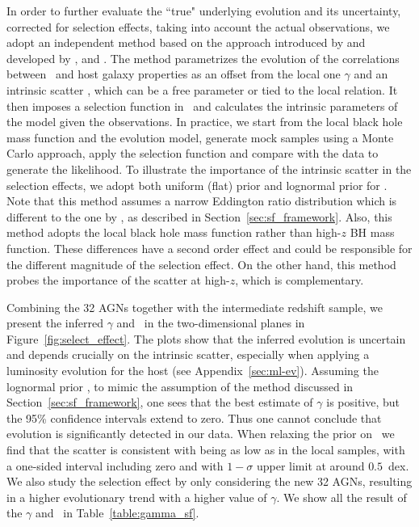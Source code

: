 \documentclass[apj]{emulateapj}
\begin{document}

In order to further evaluate the ``true" underlying evolution and its uncertainty, corrected for selection effects, taking into account the actual observations, we adopt an independent method based on the approach introduced by \citet{Tre++07} and developed by \citet{Ben++10}, \citet{Park15} and \citet{Ding2017b}. The method parametrizes the evolution of the correlations between \mbh\ and host galaxy properties as an offset from the local one $\gamma$ and an intrinsic scatter \sint, which can be a free parameter or tied to the local relation. It then imposes a selection function in \mbh\ and calculates the intrinsic parameters of the model given the observations. In practice, we start from the local black hole mass function and the evolution model, generate mock samples using a Monte Carlo approach, apply the selection function and compare with the data to generate the likelihood. To illustrate the importance of the intrinsic scatter in the selection effects, we adopt both uniform (flat) prior and lognormal prior for \sint. 
Note that this method assumes a narrow Eddington ratio distribution which is different to the one by \citet{Schulze2011}, as described in Section~\ref{sec:sf_framework}. Also, this method adopts the local black hole mass function rather than high-$z$ BH mass function. These differences have a second order effect and could be responsible for the different magnitude of the selection effect. On the other hand, this method probes the importance of the scatter at high-$z$, which is complementary. %

Combining the 32 AGNs together with the intermediate redshift sample, we present the inferred  $\gamma$ and \sint\ in the two-dimensional planes in Figure~\ref{fig:select_effect}. The plots show that the inferred evolution is uncertain and depends crucially on the intrinsic scatter, especially when applying a luminosity evolution for the host (see Appendix~\ref{sec:ml-ev}). Assuming the lognormal prior \sint, to mimic the assumption of the method discussed in Section~\ref{sec:sf_framework}, one sees that the best estimate of $\gamma$ is positive, but the 95\% confidence intervals extend to zero. Thus one cannot conclude that evolution is significantly detected in our data. 
When relaxing the prior on \sint\ we find that the scatter is consistent with being as low as in the local samples, with a one-sided interval including zero and with $1-\sigma$ upper limit at around $0.5$~dex. 
We also study the selection effect by only considering the new 32 AGNs, resulting in a higher evolutionary trend with a higher value of $\gamma$. We show all the result of the $\gamma$ and \sint\ in Table~\ref{table:gamma_sf}.
\end{document}
